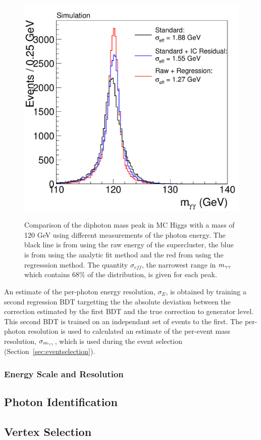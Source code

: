 \begin{figure}
\begin{center}
\includegraphics[width=.6\textwidth]{hgg7TeV/generalPlots/regrresall.pdf}
\label{fig:mcregrcomparison}
\caption{Comparison of the diphoton mass peak in MC Higgs with a mass of 120 GeV using different 
measurements of the photon energy. The black line 
is from using the raw energy of the supercluster, the blue is from using the analytic fit method 
and the red from using the regresssion method. The quantity $\sigma_{eff}$,
the narrowest range in $m_{\gamma\gamma}$ which contains 68\% of the distribution, is given for each peak.}
\end{center}
\end{figure}

An estimate of the per-photon energy resolution, $\sigma_{E}$, is obtained by training a second 
regression BDT targetting the the absolute deviation between the correction estimated by the 
first BDT and the true correction to generator level. This second BDT is trained on an independant
set of events to the first. The per-photon resolution is used to calculated an estimate of the 
per-event mass resolution, $\sigma_{m_{\gamma\gamma}}$, which is used during the event selection 
(Section~\ref{sec:eventselection}).

\subsubsection{Energy Scale and Resolution}

\subsection{Photon Identification}
\label{sec:photonidentification}

\subsection{Vertex Selection}
\label{sec:vertexselection}

